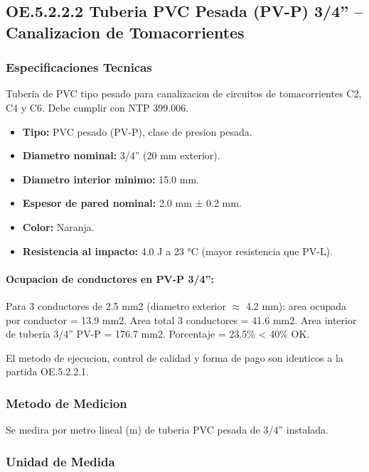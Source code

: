 \subsection{OE.5.2.2.2 Tuberia PVC Pesada (PV-P) 3/4'' -- Canalizacion de Tomacorrientes}

\subsubsection{Especificaciones Tecnicas}

Tuberia de PVC tipo pesado para canalizacion de circuitos de tomacorrientes C2, C4 y C6. Debe cumplir con NTP 399.006.

\begin{itemize}[nosep]
  \item \textbf{Tipo:} PVC pesado (PV-P), clase de presion pesada.
  \item \textbf{Diametro nominal:} 3/4'' (20 mm exterior).
  \item \textbf{Diametro interior minimo:} 15.0 mm.
  \item \textbf{Espesor de pared nominal:} 2.0 mm ± 0.2 mm.
  \item \textbf{Color:} Naranja.
  \item \textbf{Resistencia al impacto:} 4.0 J a 23 °C (mayor resistencia que PV-L).
\end{itemize}

\paragraph{Ocupacion de conductores en PV-P 3/4'':}
Para 3 conductores de 2.5 mm2 (diametro exterior $\approx$ 4.2 mm): area ocupada por conductor = 13.9 mm2. Area total 3 conductores = 41.6 mm2. Area interior de tuberia 3/4'' PV-P = 176.7 mm2. Porcentaje = 23.5\% < 40\% OK.

El metodo de ejecucion, control de calidad y forma de pago son identicos a la partida OE.5.2.2.1.

\subsubsection{Metodo de Medicion}

Se medira por metro lineal (m) de tuberia PVC pesada de 3/4'' instalada.

\subsubsection{Unidad de Medida}

